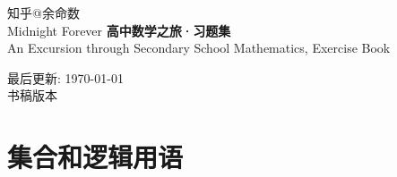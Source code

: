 \documentclass[12pt,a4paper]{ctexbook}
\theoremstyle{definition}
\theoremstyle{remark}
\begin{document}
	\begin{titlepage}
		\thispagestyle{empty} 
		\begin{flushleft}
			\vspace*{2cm}
			{\large
				知乎@余命数 \\
				Midnight Forever
			}
			\vspace{4cm}
			{\fontsize{36}{44}\selectfont\bfseries 高中数学之旅·习题集}\\[2cm]
			
			{\fontsize{22}{28}\selectfont An Excursion through Secondary School Mathematics, Exercise Book}

			\vspace{2cm}

			\vfill

			{\small
				最后更新: \today \\
				书稿版本
			}
		\end{flushleft}
	\end{titlepage}
	
	\frontmatter
	\pagestyle{plain}
	\tableofcontents
	
	\mainmatter
	\chapter{集合和逻辑用语}
	
\end{document}
